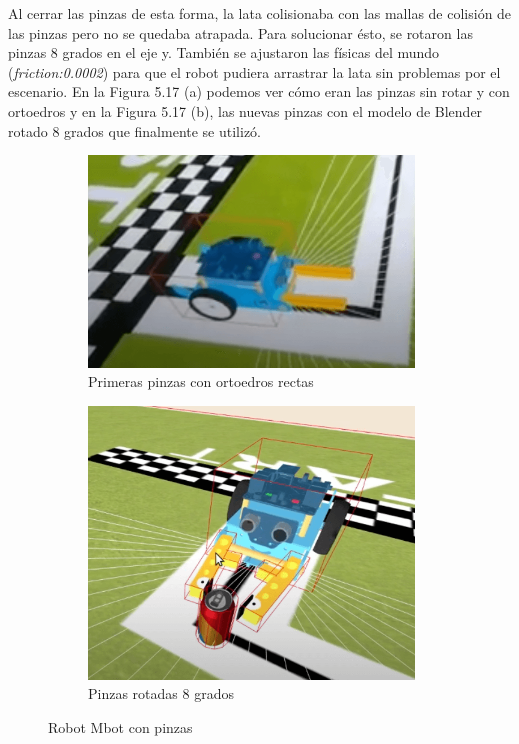Al cerrar las pinzas de esta forma, la lata colisionaba con las mallas de colisión de las pinzas pero no se quedaba atrapada. Para solucionar ésto, se rotaron las pinzas 8 grados en el eje y. También se ajustaron las físicas del mundo (\textit{friction:0.0002}) para que el robot pudiera arrastrar la lata sin problemas por el escenario. En la Figura 5.17 (a) podemos ver cómo eran las pinzas sin rotar y con ortoedros y en la Figura 5.17 (b), las nuevas pinzas con el modelo de Blender rotado 8 grados que finalmente se utilizó.


\begin{figure}[H]
  \begin{subfigure}[b]{0.5\textwidth}
  \centering
    \includegraphics[width=0.95\textwidth, height=0.6\textwidth]{chapters/images/pinzarecta.png}
    \caption{Primeras pinzas con ortoedros rectas}
    \label{fig:f1}
  \end{subfigure}
  \hfill
  \begin{subfigure}[b]{0.5\textwidth}
  \centering
    \includegraphics[width=0.95\textwidth, height=0.6\textwidth]{chapters/images/pinzaok.png}
	\caption{Pinzas rotadas 8 grados}    
    \label{fig:f2}
 
  \end{subfigure}
  \caption{Robot Mbot con pinzas}
\end{figure}

